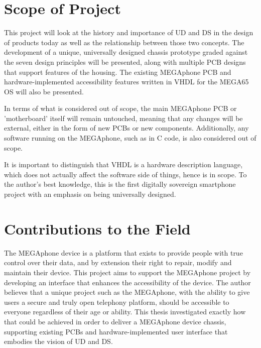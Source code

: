 \section{Scope of Project}

This project will look at the history and importance of UD and DS in the design of products today as well as the relationship between those two concepts.
The development of a unique, universally designed chassis prototype graded against the seven design principles \cite{sevenprinciples} will be presented, along with multiple PCB designs that support features of the housing.
The existing MEGAphone PCB and hardware-implemented accessibility features written in VHDL for the MEGA65 OS will also be presented.

In terms of what is considered out of scope, the main MEGAphone PCB or 'motherboard' itself will remain untouched, meaning that any changes will be external, either in the form of new PCBs or new components.
Additionally, any software running on the MEGAphone, such as in C code, is also considered out of scope.

It is important to distinguish that VHDL is a hardware description language, which does not actually affect the software side of things, hence is in scope.
To the author's best knowledge, this is the first digitally sovereign smartphone project with an emphasis on being universally designed.

\section{Contributions to the Field} %

The MEGAphone device is a platform that exists to provide people with true control over their data, and by extension their right to repair, modify and maintain their device.
This project aims to support the MEGAphone project by developing an interface that enhances the accessibility of the device.
The author believes that a unique project such as the MEGAphone, with the ability to give users a secure and truly open telephony platform, should be accessible to everyone regardless of their age or ability.
This thesis investigated exactly how that could be achieved in order to deliver a MEGAphone device chassis, supporting existing PCBs and hardware-implemented user interface that embodies the vision of UD and DS.\vspace{5mm}

